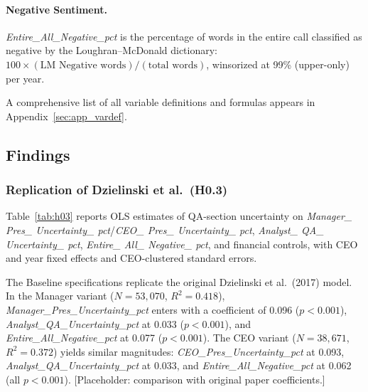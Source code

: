 \documentclass[12pt,a4paper]{article}
\begin{document}
\paragraph{Negative Sentiment.}
\textit{Entire\_All\_Negative\_pct} is the percentage of words in the entire call classified as negative by the Loughran--McDonald dictionary: $100 \times (\text{LM Negative words}) / (\text{total words})$, winsorized at 99\% (upper-only) per year.

A comprehensive list of all variable definitions and formulas appears in Appendix~\ref{sec:app_vardef}.

\subsection{Findings}
\label{sec:findings}

\subsubsection{Replication of Dzielinski et al.\ (H0.3)}
\label{sec:h03}

Table~\ref{tab:h03} reports OLS estimates of QA-section uncertainty on \textit{Manager\_ Pres\_ Uncertainty\_ pct}/\textit{CEO\_ Pres\_ Uncertainty\_ pct}, \textit{Analyst\_ QA\_ Uncertainty\_ pct}, \textit{Entire\_ All\_ Negative\_ pct}, and financial controls, with CEO and year fixed effects and CEO-clustered standard errors.

The Baseline specifications replicate the original Dzielinski et al.\ (2017) model. In the Manager variant ($N = 53{,}070$, $R^2 = 0.418$), \textit{Manager\_Pres\_Uncertainty\_pct} enters with a coefficient of 0.096 ($p < 0.001$), \textit{Analyst\_QA\_Uncertainty\_pct} at 0.033 ($p < 0.001$), and \textit{Entire\_All\_Negative\_pct} at 0.077 ($p < 0.001$). The CEO variant ($N = 38{,}671$, $R^2 = 0.372$) yields similar magnitudes: \textit{CEO\_Pres\_Uncertainty\_pct} at 0.093, \textit{Analyst\_QA\_Uncertainty\_pct} at 0.033, and \textit{Entire\_All\_Negative\_pct} at 0.062 (all $p < 0.001$). [Placeholder: comparison with original paper coefficients.]
\end{document}
